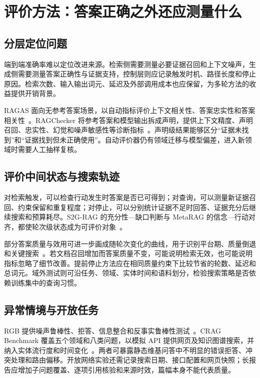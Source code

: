 \section{评价方法：答案正确之外还应测量什么}
\label{sec:evaluation}

\subsection{分层定位问题}

端到端准确率难以定位改进来源。检索侧需要测量必要证据召回和上下文噪声，生成侧需要测量答案正确性与证据支持，控制层则应记录触发时机、路径长度和停止原因。检索次数、输入输出词元、延迟及外部调用成本也应保留，为多轮方法的收益提供开销背景。

RAGAS 面向无参考答案场景，以自动指标评价上下文相关性、答案忠实性和答案相关性~\citep{es2024ragas}。RAGChecker 将参考答案和模型输出拆成声明，提供上下文精度、声明召回、忠实性、幻觉和噪声敏感性等诊断指标~\citep{ru2024ragchecker}。声明级结果能够区分“证据未找到”和“证据找到但未正确使用”。自动评价器仍有领域迁移与模型偏差，进入新领域时需要人工抽样复核。

\subsection{评价中间状态与搜索轨迹}

对检索触发，可以检查行动发生时答案是否已可得到；对查询，可以测量新证据召回、约束保留和重复程度；对停止，可以分别统计证据不足时回答、证据充分后继续搜索和预算耗尽。S2G-RAG 的充分性—缺口判断与 MetaRAG 的信念—行动对齐，都使轮次级状态成为可评价对象~\citep{li2026s2g,qi2026metarag}。

部分答案质量与效用可进一步画成随轮次变化的曲线，用于识别平台期、质量倒退和关键搜索~\citep{tian2026partial}。若文档召回增加而答案质量不变，可能说明检索无效，也可能说明指标忽略了细节改善。提前停止方法应在相同质量约束下比较节省的轮数、延迟和总词元。域外测试则可沿任务、领域、实体时间和语料划分，检验搜索策略是否依赖训练集中的查询习惯。

\subsection{异常情境与开放任务}

RGB 提供噪声鲁棒性、拒答、信息整合和反事实鲁棒性测试~\citep{chen2024rgb}。CRAG Benchmark 覆盖五个领域和八类问题，以模拟 API 提供网页及知识图谱搜索，并纳入实体流行度和时间变化~\citep{yang2024cragbench}。两者可暴露静态维基问答中不明显的错误拒答、冲突处理和路由偏移。开放网络实验还需记录搜索日期、接口配置和网页快照；长报告应增加子问题覆盖、逐项引用核验和来源时效，篇幅本身不能代表质量。

